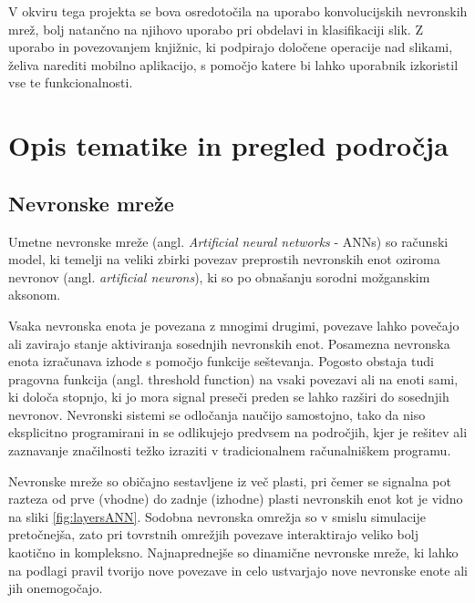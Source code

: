 \documentclass[runningheads,a4paper]{llncs}
\begin{document}
V okviru tega projekta se bova osredotočila na uporabo konvolucijskih nevronskih mrež, bolj natančno na njihovo uporabo pri obdelavi in klasifikaciji slik. Z uporabo in povezovanjem knjižnic, ki podpirajo določene operacije nad slikami, želiva narediti mobilno aplikacijo, s pomočjo katere bi lahko uporabnik izkoristil vse te funkcionalnosti.

\raggedbottom
\section{Opis tematike in pregled področja}

\subsection{Nevronske mreže}
Umetne nevronske mreže (angl. \textit{Artificial neural networks} - ANNs) so računski model, ki temelji na veliki zbirki povezav preprostih nevronskih enot oziroma nevronov (angl. \textit{artificial neurons}), ki so po obnašanju sorodni možganskim aksonom\cite{wiki:ANN}. 

Vsaka nevronska enota je povezana z mnogimi drugimi, povezave lahko povečajo ali zavirajo stanje aktiviranja sosednjih nevronskih enot. Posamezna nevronska enota izračunava izhode s pomočjo funkcije seštevanja. Pogosto obstaja tudi pragovna funkcija (angl. threshold function) na vsaki povezavi ali na enoti sami, ki določa stopnjo, ki jo mora signal preseči preden se lahko razširi do sosednjih nevronov. Nevronski sistemi se odločanja naučijo samostojno, tako da niso eksplicitno programirani in se odlikujejo predvsem na področjih, kjer je rešitev ali zaznavanje značilnosti težko izraziti v tradicionalnem računalniškem programu.

Nevronske mreže so običajno sestavljene iz več plasti, pri čemer se signalna pot razteza od prve (vhodne) do zadnje (izhodne) plasti nevronskih enot kot je vidno na sliki \ref{fig:layersANN}. Sodobna nevronska omrežja so v smislu simulacije pretočnejša, zato pri tovrstnih omrežjih povezave interaktirajo veliko bolj kaotično in kompleksno. Najnaprednejše so dinamične nevronske mreže, ki lahko na podlagi pravil tvorijo nove povezave in celo ustvarjajo nove nevronske enote ali jih onemogočajo.
\end{document}
